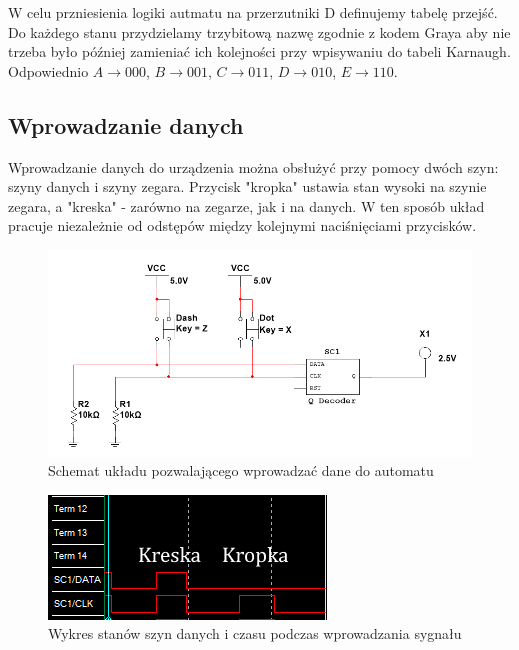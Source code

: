 \documentclass[12pt,a4paper,table]{article}
\begin{document}

    W celu przniesienia logiki autmatu na przerzutniki D definujemy tabelę przejść.
    Do każdego stanu przydzielamy trzybitową nazwę zgodnie z kodem Graya aby nie trzeba było później zamieniać ich kolejności przy wpisywaniu do tabeli Karnaugh.
    Odpowiednio $ A \to  000 $, $ B \to  001$, $ C \to 011$, $ D \to 010$, $ E \to 110$.

    \subsection{Wprowadzanie danych}
    Wprowadzanie danych do urządzenia można obsłużyć przy pomocy dwóch
    szyn: szyny danych i szyny zegara. Przycisk "kropka" ustawia stan wysoki
    na szynie zegara, a "kreska" - zarówno na zegarze, jak i na danych.
    W ten sposób układ pracuje niezależnie od odstępów między kolejnymi naciśnięciami
    przycisków.

    \begin{figure}[h]
        \centering
        \includegraphics[width=\linewidth]{images/q_input.PNG}
        \caption{Schemat układu pozwalającego wprowadzać dane do automatu}
        \label{fig:q_input}
    \end{figure}


    \begin{figure}[h]
        \centering
        \includegraphics[width=0.3\linewidth]{images/q_input_plot.PNG}
        \caption{Wykres stanów szyn danych i czasu podczas wprowadzania
        sygnału}
        \label{fig:q_idea_plot}
    \end{figure}
\end{document}
